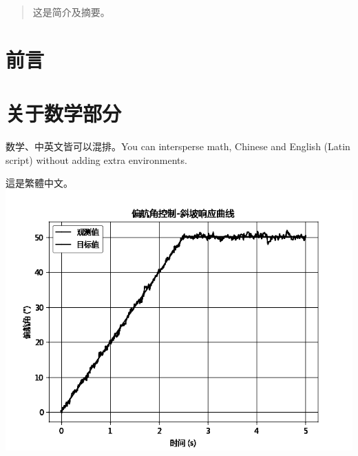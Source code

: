 \documentclass{ctexart}
\begin{document}
 
\tableofcontents
 
\begin{abstract}
这是简介及摘要。
\end{abstract}
 
\section{ 前言 }
 
\section{关于数学部分}
数学、中英文皆可以混排。You can intersperse math, Chinese and English (Latin script) without adding extra environments.
 
這是繁體中文。
\includegraphics{img/yaw_control.png}
 
\end{document}
